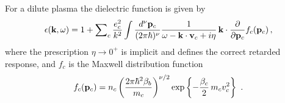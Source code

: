 \documentclass[preprint,12pt,eqsecnum,nofootinbib,amsmath,amssymb]{revtex4}
\begin{document}
For a dilute plasma the dielectric function is given
by\cite{Lifs}
\begin{equation}
  \epsilon({\bf k},\omega) = 1 + {\sum}_c \,
  \frac{e_c^2}{k^2} \int
  \frac{d^\nu {\bf p}_c}{( 2\pi\hbar )^\nu }
  \frac{ 1 }{ \omega - {\bf k} \cdot{\bf v}_c + i \eta}\,
  {\bf k} \cdot \frac{\partial}{\partial {\bf p}_c }
    f_c({\bf p}_c) \,,
\label{epsilon}
\end{equation}
where the prescription $ \eta \to 0^+ $ is implicit and defines the
correct retarded response, and $f_c$ is the Maxwell distribution
function
\begin{eqnarray}
  f_c({\bf p}_c) 
  = n_c \left(\frac{2\pi \hbar^2 \beta_b}
  {m_c}\right)^{\nu/2} \exp\left\{- {\beta_c \over 2} \, 
  m_c v_c^2 \right\} \ .
\label{MB}
\end{eqnarray}
\end{document}
